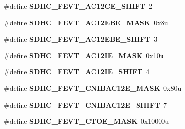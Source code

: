 \begin{DoxyCompactItemize}
\item 
\hypertarget{group___s_d_h_c___register___masks_ga6765ca9b4ffb1bf49aa914593c6d6476}{}\#define {\bfseries S\+D\+H\+C\+\_\+\+F\+E\+V\+T\+\_\+\+A\+C12\+C\+E\+\_\+\+S\+H\+I\+F\+T}~2\label{group___s_d_h_c___register___masks_ga6765ca9b4ffb1bf49aa914593c6d6476}

\item 
\hypertarget{group___s_d_h_c___register___masks_gaf9bf81ce7359d8baeaa6da8d311a17df}{}\#define {\bfseries S\+D\+H\+C\+\_\+\+F\+E\+V\+T\+\_\+\+A\+C12\+E\+B\+E\+\_\+\+M\+A\+S\+K}~0x8u\label{group___s_d_h_c___register___masks_gaf9bf81ce7359d8baeaa6da8d311a17df}

\item 
\hypertarget{group___s_d_h_c___register___masks_gad04d7f7589f8abb9ec05a978c7ec2ea9}{}\#define {\bfseries S\+D\+H\+C\+\_\+\+F\+E\+V\+T\+\_\+\+A\+C12\+E\+B\+E\+\_\+\+S\+H\+I\+F\+T}~3\label{group___s_d_h_c___register___masks_gad04d7f7589f8abb9ec05a978c7ec2ea9}

\item 
\hypertarget{group___s_d_h_c___register___masks_gae0fbba676b66b6816ebf1a406cde14e2}{}\#define {\bfseries S\+D\+H\+C\+\_\+\+F\+E\+V\+T\+\_\+\+A\+C12\+I\+E\+\_\+\+M\+A\+S\+K}~0x10u\label{group___s_d_h_c___register___masks_gae0fbba676b66b6816ebf1a406cde14e2}

\item 
\hypertarget{group___s_d_h_c___register___masks_gaeb6a120837319438325080701d73318b}{}\#define {\bfseries S\+D\+H\+C\+\_\+\+F\+E\+V\+T\+\_\+\+A\+C12\+I\+E\+\_\+\+S\+H\+I\+F\+T}~4\label{group___s_d_h_c___register___masks_gaeb6a120837319438325080701d73318b}

\item 
\hypertarget{group___s_d_h_c___register___masks_gab66c71256369c4a831fc9638fea7b8d1}{}\#define {\bfseries S\+D\+H\+C\+\_\+\+F\+E\+V\+T\+\_\+\+C\+N\+I\+B\+A\+C12\+E\+\_\+\+M\+A\+S\+K}~0x80u\label{group___s_d_h_c___register___masks_gab66c71256369c4a831fc9638fea7b8d1}

\item 
\hypertarget{group___s_d_h_c___register___masks_ga957c710cf39c6135c058ed28b24a73e0}{}\#define {\bfseries S\+D\+H\+C\+\_\+\+F\+E\+V\+T\+\_\+\+C\+N\+I\+B\+A\+C12\+E\+\_\+\+S\+H\+I\+F\+T}~7\label{group___s_d_h_c___register___masks_ga957c710cf39c6135c058ed28b24a73e0}

\item 
\hypertarget{group___s_d_h_c___register___masks_ga5ecd45d4cd669e887f5cef39e6a8f508}{}\#define {\bfseries S\+D\+H\+C\+\_\+\+F\+E\+V\+T\+\_\+\+C\+T\+O\+E\+\_\+\+M\+A\+S\+K}~0x10000u\label{group___s_d_h_c___register___masks_ga5ecd45d4cd669e887f5cef39e6a8f508}


\end{DoxyCompactItemize}
